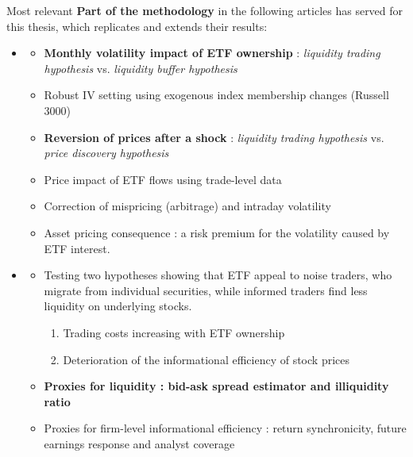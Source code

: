 \documentclass[handout, 9pt, usenames, dvipsnames]{beamer}
\begin{document}
\begin{frame}[allowframebreaks]
  \begin{exampleblock}{Most relevant}
    {\bfseries Part of the methodology} in the following articles has served for this thesis, which replicates and extends their results:
    \begin{itemize}
    \item \textcite{Ben-David2018}
      \begin{itemize}
      \item {\bfseries Monthly volatility impact of ETF ownership} : \emph{liquidity trading hypothesis} vs. \emph{liquidity buffer hypothesis}
      \item Robust IV setting using exogenous index membership changes (Russell 3000)
      \item {\bfseries Reversion of prices after a shock} : \emph{liquidity trading hypothesis} vs. \emph{price discovery hypothesis}
      \item Price impact of ETF flows using trade-level data
      \item Correction of mispricing (arbitrage) and intraday volatility
      \item Asset pricing consequence : a risk premium for the volatility caused by ETF interest.      
      \end{itemize}
    \item \textcite{Israeli2017}
      \begin{itemize}
      \item Testing two hypotheses showing that ETF appeal to noise traders, who migrate from individual securities, while informed traders find less liquidity on underlying stocks.
        \begin{enumerate}
        \item Trading costs increasing with ETF ownership
        \item Deterioration of the informational efficiency of stock prices
        \end{enumerate}
      \item {\bfseries Proxies for liquidity : bid-ask spread estimator and \textcite{Amihud2002} illiquidity ratio}
      \item Proxies for firm-level informational efficiency : return synchronicity, future earnings response and analyst coverage
      \end{itemize}
    \end{itemize}
  \end{exampleblock}
\end{frame}
\end{document}
